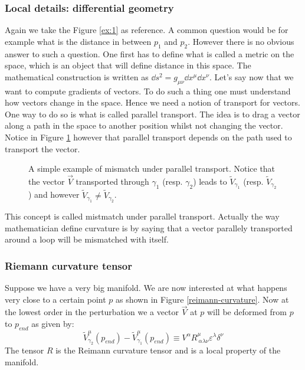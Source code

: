 \documentclass[10pt,a4paper]{book}
\begin{document}
\subsubsection{Local details: differential geometry}
Again we take the Figure \ref{ex:1} as reference. A common question would be for example what is the distance in between $p_1$ and $p_2$. However there is no obvious answer to such a question. One first has to define what is called a metric on the space, which is an object that will define distance in this space. The mathematical construction is written as $\dd s^2 = g_{\mu \nu} \dd x^\mu \dd x^\nu$. Let's say now that we want to compute gradients of vectors. To do such a thing one must understand how vectors change in the space. Hence we need a notion of transport for vectors. One way to do so is what is called parallel transport. The idea is to drag a vector along a path in the space to another position whilst not changing the vector. Notice in Figure \ref{parallel transport} however that parallel transport depends on the path used to transport the vector.
\begin{figure}[h] \label{parallel transport}
\centering
{}
\caption{A simple example of mismatch under parallel transport. Notice that the vector $\vec{V}$ transported through $\gamma_1$ (resp. $\gamma_2$) leads to $\tilde{V}_{\gamma_1}$ (resp.  $\tilde{V}_{\gamma_2}$) and however $\tilde{V}_{\gamma_1} \neq  \tilde{V}_{\gamma_2}$.}
\end{figure}
This concept is called mistmatch under parallel transport. Actually the way mathematician define curvature is by saying that a vector parallely transported around a loop will be mismatched with itself.

\subsubsection{Riemann curvature tensor}
Suppose we have a very big manifold. We are now interested at what happens very close to a certain point $p$ as shown in Figure \ref{reimann-curvature}. Now at the lowest order in the perturbation we a vector $\overrightarrow{V}$ at $p$ will be deformed from $p$ to $p_{end}$ as given by:
\[
\tilde{V}^\mu_{\gamma_2} (p_{end}) - \tilde{V}^\mu_{\gamma_1}(p_{end}) \equiv V^\alpha R_{~\alpha \lambda \nu}^{\mu} \varepsilon^\lambda \delta^\nu
\]
The tensor $R$ is the Reimann curvature tensor and is a local property of the manifold.
\end{document}
